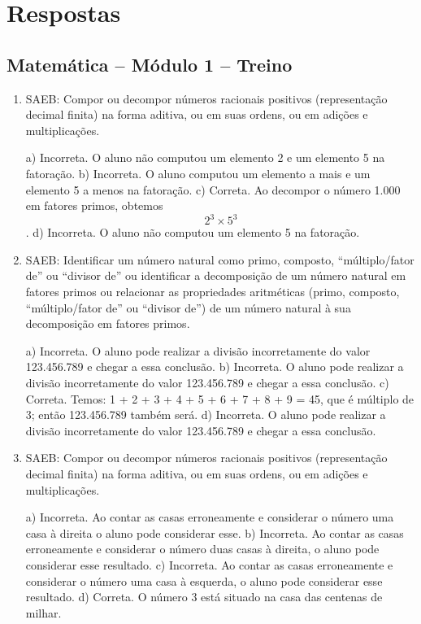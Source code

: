 \chapter{Respostas}
\pagestyle{plain}
\footnotesize

\pagecolor{gray!40}

\section*{Matemática – Módulo 1 – Treino}

\begin{enumerate}
\item SAEB: Compor ou decompor números racionais positivos (representação
decimal finita) na forma aditiva, ou em suas ordens, ou em adições e
multiplicações.

a) Incorreta. O aluno não computou um elemento 2 e um elemento 5
na fatoração.
b) Incorreta. O aluno computou um elemento a mais e um elemento 5 a
menos na fatoração.
c) Correta. Ao decompor o número 1.000 em fatores primos, obtemos
$$2^3 \times 5^3$$.
d) Incorreta. O aluno não computou um elemento 5 na fatoração.

\item SAEB: Identificar um número natural como primo, composto,
``múltiplo/fator de'' ou ``divisor de'' ou identificar a decomposição de
um número natural em fatores primos ou relacionar as propriedades
aritméticas (primo, composto, ``múltiplo/fator de'' ou ``divisor de'')
de um número natural à sua decomposição em fatores primos.

a) Incorreta. O aluno pode realizar a divisão incorretamente do
valor 123.456.789 e chegar a essa conclusão.
b) Incorreta. O aluno pode realizar a divisão incorretamente do
valor 123.456.789 e chegar a essa conclusão.
c) Correta. Temos: 1 + 2 + 3 + 4 + 5 + 6 + 7 + 8 + 9 = 45, que é
múltiplo de 3; então 123.456.789 também será.
d) Incorreta. O aluno pode realizar a divisão incorretamente do
valor 123.456.789 e chegar a essa conclusão.

\item SAEB: Compor ou decompor números racionais positivos (representação
decimal finita) na forma aditiva, ou em suas ordens, ou em adições e
multiplicações.

a) Incorreta. Ao contar as casas erroneamente e considerar o
número uma casa à direita o aluno pode considerar esse.
b) Incorreta. Ao contar as casas erroneamente e considerar o
número duas casas à direita, o aluno pode considerar esse resultado.
c) Incorreta. Ao contar as casas erroneamente e considerar o
número uma casa à esquerda, o aluno pode considerar esse resultado.
d) Correta. O número 3 está situado na casa das centenas de milhar.

\end{enumerate}


